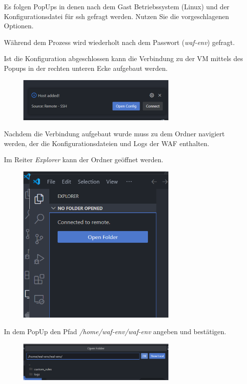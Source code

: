 Es folgen PopUps in denen nach dem Gast Betriebssystem (Linux) und der Konfigurationsdatei für ssh gefragt werden.
Nutzen Sie die vorgeschlagenen Optionen.

Während dem Prozess wird wiederholt nach dem Passwort (\textit{waf-env}) gefragt.

Ist die Konfiguration abgeschlossen kann die Verbindung zu der VM mittels des Popups in der rechten unteren Ecke aufgebaut werden.

\begin{figure}[!hbt]
    \centering
    \includegraphics[width=0.7\textwidth]{./images/vscode-connect.png}
\end{figure}

Nachdem die Verbindung aufgebaut wurde muss zu dem Ordner navigiert werden, der die Konfigurationsdateien und Logs der WAF enthalten.

Im Reiter \textit{Explorer} kann der Ordner geöffnet werden.

\begin{figure}[!hbt]
    \centering
    \includegraphics[width=0.7\textwidth]{./images/vscode-initiate-nw-dir.png}
\end{figure}

In dem PopUp den Pfad \textit{/home/waf-env/waf-env} angeben und bestätigen.

\begin{figure}[!hbt]
    \centering
    \includegraphics[width=0.7\textwidth]{./images/vscode-dir-path.png}
\end{figure}

